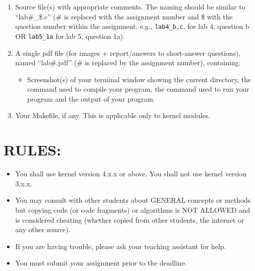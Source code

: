 \documentclass{article}
\begin{document}
\begin{enumerate}
    \item Source file(s) with appropriate comments. The naming should be similar to “lab\#\_\$.c” (\# is replaced with the assignment number and \$ with the question number within the assignment, e.g., \texttt{lab4\_b.c}, for lab 4, question b OR \texttt{lab5\_1a} for lab 5, question 1a).
    \item A single pdf file (for images + report/answers to short-answer questions), named “lab\#.pdf” (\# is replaced by the assignment number), containing:
    \begin{itemize}
        \item Screenshot(s) of your terminal window showing the current directory, the command used to compile your program, the command used to run your program and the output of your program.
    \end{itemize}
    \item Your Makefile, if any. This is applicable only to kernel modules.
\end{enumerate}

\section*{RULES:}

\begin{itemize}
    \item You shall use kernel version 4.x.x or above. You shall not use kernel version 3.x.x.
    \item You may consult with other students about GENERAL concepts or methods but copying code (or code fragments) or algorithms is NOT ALLOWED and is considered cheating (whether copied from other students, the internet or any other source).
    \item If you are having trouble, please ask your teaching assistant for help.
    \item You must submit your assignment prior to the deadline.
\end{itemize}
\end{document}
